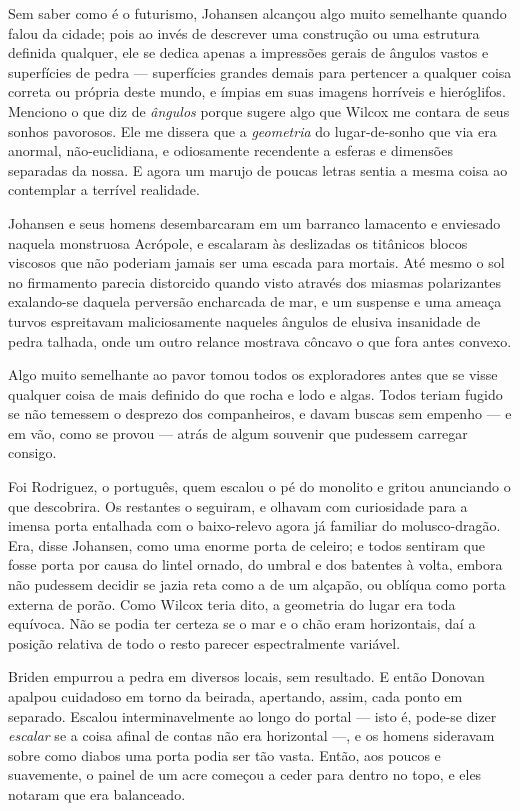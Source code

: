 \begin{pages}
\begin{Rightside}
Sem saber como é o futurismo, Johansen alcançou algo muito semelhante
quando falou da cidade; pois ao invés de descrever uma construção ou uma
estrutura definida qualquer, ele se dedica apenas a impressões gerais de
ângulos vastos e superfícies de pedra --- superfícies grandes demais
para pertencer a qualquer coisa correta ou própria deste mundo, e ímpias
em suas imagens horríveis e hieróglifos. Menciono o que diz de
\emph{ângulos} porque sugere algo que Wilcox me contara de seus sonhos
pavorosos. Ele me dissera que a \emph{geometria} do lugar-de-sonho que
via era anormal, não-euclidiana, e odiosamente recendente a esferas e
dimensões separadas da nossa. E agora um marujo de poucas letras sentia
a mesma coisa ao contemplar a terrível realidade.

Johansen e seus homens desembarcaram em um barranco lamacento e
enviesado naquela monstruosa Acrópole, e escalaram às deslizadas os
titânicos blocos viscosos que não poderiam jamais ser uma escada para
mortais. Até mesmo o sol no firmamento parecia distorcido quando visto
através dos miasmas polarizantes exalando-se daquela perversão
encharcada de mar, e um suspense e uma ameaça turvos espreitavam
maliciosamente naqueles ângulos de elusiva insanidade de pedra talhada,
onde um outro relance mostrava côncavo o que fora antes convexo.

Algo muito semelhante ao pavor tomou todos os exploradores antes que se
visse qualquer coisa de mais definido do que rocha e lodo e algas. Todos
teriam fugido se não temessem o desprezo dos companheiros, e davam
buscas sem empenho --- e em vão, como se provou --- atrás de algum souvenir que pudessem carregar consigo.

Foi Rodriguez, o português, quem escalou o pé do monolito e
gritou anunciando o que descobrira. Os restantes o seguiram, e olhavam
com curiosidade para a imensa porta entalhada com o baixo-relevo agora
já familiar do molusco-dragão. Era, disse Johansen, como uma enorme
porta de celeiro; e todos sentiram que fosse porta por causa do lintel
ornado, do umbral e dos batentes à volta, embora não pudessem decidir se
jazia reta como a de um alçapão, ou oblíqua como porta externa de porão.
Como Wilcox teria dito, a geometria do lugar era toda equívoca. Não se
podia ter certeza se o mar e o chão eram horizontais, daí a posição
relativa de todo o resto parecer espectralmente variável.

Briden empurrou a pedra em diversos locais, sem resultado. E então
Donovan apalpou cuidadoso em torno da beirada, apertando, assim, cada
ponto em separado. Escalou interminavelmente ao longo do portal --- isto
é, pode-se dizer \emph{escalar} se a coisa afinal de contas não era
horizontal ---, e os homens sideravam sobre como diabos uma porta podia
ser tão vasta. Então, aos poucos e suavemente, o painel de um acre
começou a ceder para dentro no topo, e eles notaram que era balanceado.


\end{Rightside}
\end{pages}
